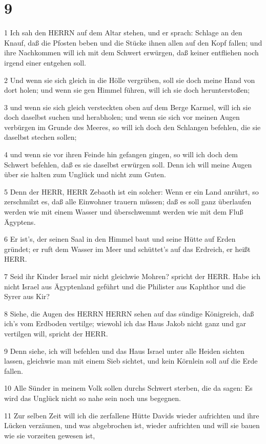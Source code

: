 \chapter{9}

\par 1 Ich sah den HERRN auf dem Altar stehen, und er sprach: Schlage an den Knauf, daß die Pfosten beben und die Stücke ihnen allen auf den Kopf fallen; und ihre Nachkommen will ich mit dem Schwert erwürgen, daß keiner entfliehen noch irgend einer entgehen soll.
\par 2 Und wenn sie sich gleich in die Hölle vergrüben, soll sie doch meine Hand von dort holen; und wenn sie gen Himmel führen, will ich sie doch herunterstoßen;
\par 3 und wenn sie sich gleich versteckten oben auf dem Berge Karmel, will ich sie doch daselbst suchen und herabholen; und wenn sie sich vor meinen Augen verbürgen im Grunde des Meeres, so will ich doch den Schlangen befehlen, die sie daselbst stechen sollen;
\par 4 und wenn sie vor ihren Feinde hin gefangen gingen, so will ich doch dem Schwert befehlen, daß es sie daselbst erwürgen soll. Denn ich will meine Augen über sie halten zum Unglück und nicht zum Guten.
\par 5 Denn der HERR, HERR Zebaoth ist ein solcher: Wenn er ein Land anrührt, so zerschmilzt es, daß alle Einwohner trauern müssen; daß es soll ganz überlaufen werden wie mit einem Wasser und überschwemmt werden wie mit dem Fluß Ägyptens.
\par 6 Er ist's, der seinen Saal in den Himmel baut und seine Hütte auf Erden gründet; er ruft dem Wasser im Meer und schüttet's auf das Erdreich, er heißt HERR.
\par 7 Seid ihr Kinder Israel mir nicht gleichwie Mohren? spricht der HERR. Habe ich nicht Israel aus Ägyptenland geführt und die Philister aus Kaphthor und die Syrer aus Kir?
\par 8 Siehe, die Augen des HERRN HERRN sehen auf das sündige Königreich, daß ich's vom Erdboden vertilge; wiewohl ich das Haus Jakob nicht ganz und gar vertilgen will, spricht der HERR.
\par 9 Denn siehe, ich will befehlen und das Haus Israel unter alle Heiden sichten lassen, gleichwie man mit einem Sieb sichtet, und kein Körnlein soll auf die Erde fallen.
\par 10 Alle Sünder in meinem Volk sollen durchs Schwert sterben, die da sagen: Es wird das Unglück nicht so nahe sein noch uns begegnen.
\par 11 Zur selben Zeit will ich die zerfallene Hütte Davids wieder aufrichten und ihre Lücken verzäunen, und was abgebrochen ist, wieder aufrichten und will sie bauen wie sie vorzeiten gewesen ist,
